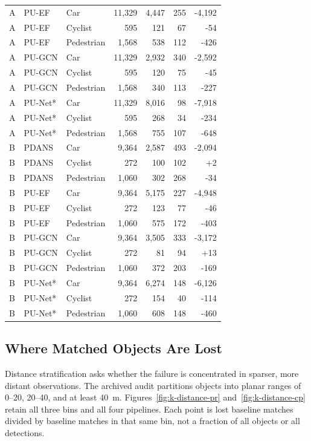 \begin{longtable}{lllrrrr}
A & PU-EF & Car & 11,329 & 4,447 & 255 & -4,192 \\
A & PU-EF & Cyclist & 595 & 121 & 67 & -54 \\
A & PU-EF & Pedestrian & 1,568 & 538 & 112 & -426 \\
A & PU-GCN & Car & 11,329 & 2,932 & 340 & -2,592 \\
A & PU-GCN & Cyclist & 595 & 120 & 75 & -45 \\
A & PU-GCN & Pedestrian & 1,568 & 340 & 113 & -227 \\
A & PU-Net* & Car & 11,329 & 8,016 & 98 & -7,918 \\
A & PU-Net* & Cyclist & 595 & 268 & 34 & -234 \\
A & PU-Net* & Pedestrian & 1,568 & 755 & 107 & -648 \\
B & PDANS & Car & 9,364 & 2,587 & 493 & -2,094 \\
B & PDANS & Cyclist & 272 & 100 & 102 & +2 \\
B & PDANS & Pedestrian & 1,060 & 302 & 268 & -34 \\
B & PU-EF & Car & 9,364 & 5,175 & 227 & -4,948 \\
B & PU-EF & Cyclist & 272 & 123 & 77 & -46 \\
B & PU-EF & Pedestrian & 1,060 & 575 & 172 & -403 \\
B & PU-GCN & Car & 9,364 & 3,505 & 333 & -3,172 \\
B & PU-GCN & Cyclist & 272 & 81 & 94 & +13 \\
B & PU-GCN & Pedestrian & 1,060 & 372 & 203 & -169 \\
B & PU-Net* & Car & 9,364 & 6,274 & 148 & -6,126 \\
B & PU-Net* & Cyclist & 272 & 154 & 40 & -114 \\
B & PU-Net* & Pedestrian & 1,060 & 608 & 148 & -460 \\
\end{longtable}

\subsection{Where Matched Objects Are Lost}
\label{sec:kitti-distance}

Distance stratification asks whether the failure is concentrated in
sparser, more distant observations. The archived audit partitions
objects into planar ranges of 0--20, 20--40, and at least 40~m.
Figures~\ref{fig:k-distance-pr} and~\ref{fig:k-distance-cp} retain all
three bins and all four pipelines. Each point is lost baseline matches
divided by baseline matches in that same bin, not a fraction of all
objects or all detections.

